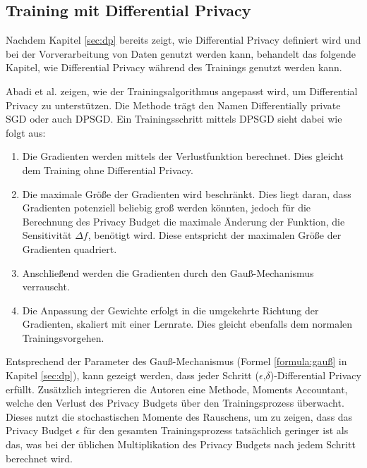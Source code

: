 \subsection{Training mit Differential Privacy}\label{sec:dp_training}

Nachdem Kapitel \ref{sec:dp} bereits zeigt, wie Differential Privacy definiert wird und bei der Vorverarbeitung von Daten genutzt werden kann, behandelt das folgende Kapitel, wie Differential Privacy während des Trainings genutzt werden kann.

Abadi et al. \cite{P-28} zeigen, wie der Trainingsalgorithmus angepasst wird, um Differential Privacy zu unterstützen.
Die Methode trägt den Namen Differentially private SGD oder auch DPSGD.
Ein Trainingsschritt mittels DPSGD sieht dabei wie folgt aus:
\begin{enumerate}
    \item Die Gradienten werden mittels der Verlustfunktion berechnet. Dies gleicht dem Training ohne Differential Privacy.
    \item Die maximale Größe der Gradienten wird beschränkt. Dies liegt daran, dass Gradienten potenziell beliebig groß werden könnten, jedoch für die Berechnung des Privacy Budget die maximale Änderung der Funktion, die Sensitivität $\Delta f$, benötigt wird. Diese entspricht der maximalen Größe der Gradienten quadriert.
    \item Anschließend werden die Gradienten durch den Gauß-Mechanismus verrauscht. 
    \item Die Anpassung der Gewichte erfolgt in die umgekehrte Richtung der Gradienten, skaliert mit einer Lernrate. Dies gleicht ebenfalls dem normalen Trainingsvorgehen.
\end{enumerate}

Entsprechend der Parameter des Gauß-Mechanismus (Formel \ref{formula:gauß} in Kapitel \ref{sec:dp}), kann gezeigt werden, dass jeder Schritt ($\epsilon$,$\delta$)-Differential Privacy erfüllt.
Zusätzlich integrieren die Autoren eine Methode, Moments Accountant, welche den Verlust des Privacy Budgets über den Trainingsprozess überwacht.
Dieses nutzt die stochastischen Momente des Rauschens, um zu zeigen, dass das Privacy Budget $\epsilon$ für den gesamten Trainingsprozess tatsächlich geringer ist als das, was bei der üblichen Multiplikation des Privacy Budgets nach jedem Schritt berechnet wird.